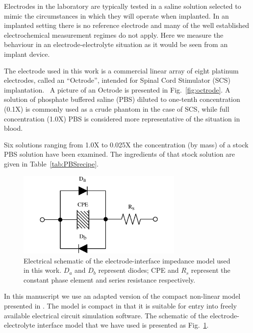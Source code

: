 \documentclass[journal, a4paper]{IEEEtran}
\begin{document}
Electrodes in the laboratory are typically tested in a saline solution selected to mimic the circumstances in which they will operate when implanted.
In an implanted setting there is no reference electrode and many of the well established electrochemical measurement regimes do not apply.
Here we measure the behaviour in an electrode-electrolyte situation as it would be seen from an implant device.

The electrode used in this work is a commercial linear array of eight platinum electrodes, called an ``Octrode'', intended for Spinal Cord Stimulator (SCS) implantation.~\cite{StJudeOctrode}
A picture of an Octrode is presented in Fig.~\ref{fig:octrode}.
A solution of phosphate buffered saline (PBS) diluted to one-tenth concentration (0.1X) is commonly used as a crude phantom in the case of SCS, while full concentration (1.0X) PBS is considered more representative of the situation in blood.

Six solutions ranging from 1.0X to 0.025X the concentration (by mass) of a stock PBS solution have been examined.
The ingredients of that stock solution are given in Table~\ref{tab:PBSrecipe}.

\begin{figure}
    \begin{center}
        \includegraphics[width=230pt]{graphics/interfaceSchematic_noMemristive}
    \end{center}
    \caption{Electrical schematic of the electrode-interface impedance model used in this work. $D_{a}$ and $D_{b}$ represent diodes; CPE and $R_{s}$ represent the constant phase element and series resistance respectively.}
    \label{fig:schematic}
\end{figure}

In this manuscript we use an adapted version of the compact non-linear model presented in \cite{ScottSingle2013}.
The model is compact in that it is suitable for entry into freely available electrical circuit simulation software.
The schematic of the electrode-electrolyte interface model that we have used is presented as Fig.~\ref{fig:schematic}.
\end{document}
